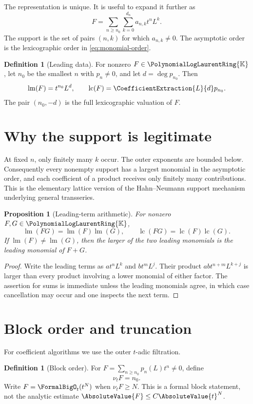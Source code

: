 \documentclass[11pt,oneside]{book}
\newtheorem{proposition}[theorem]{Proposition}
\theoremstyle{definition}
\newtheorem{definition}[theorem]{Definition}
\theoremstyle{remark}
\DeclareMathOperator{\lm}{lm}
\DeclareMathOperator{\lc}{lc}
\newcommand{\K}{\mathbb K}
\newcommand{\PLpoly}{\PolynomialLogLaurentRing{\K}}
\begin{document}
The representation is unique.  It is useful to expand it further as
\[
 F=\sum_{n\ge n_0}\sum_{k=0}^{d_n}a_{n,k}t^nL^k.
\]
The support is the set of pairs $(n,k)$ for which $a_{n,k}\ne0$.
The asymptotic order is the lexicographic order in \eqref{eq:monomial-order}.

\begin{definition}[Leading data]
For nonzero $F\in\PLpoly$, let $n_0$ be the smallest $n$ with
$p_n\ne0$, and let $d=\deg p_{n_0}$.  Then
\[
 \lm(F)=t^{n_0}L^d,
 \qquad
 \lc(F)=\CoefficientExtraction{L}{d}p_{n_0}.
\]
The pair $(n_0,-d)$ is the full lexicographic valuation of $F$.
\end{definition}

\section{Why the support is legitimate}
At fixed $n$, only finitely many $k$ occur.  The outer exponents are bounded
below.  Consequently every nonempty support has a largest monomial in the
asymptotic order, and each coefficient of a product receives only finitely
many contributions.  This is the elementary lattice version of the
Hahn--Neumann support mechanism underlying general transseries.

\begin{proposition}[Leading-term arithmetic]\label{prop:leading-arithmetic}
For nonzero $F,G\in\PLpoly$,
\[
 \lm(FG)=\lm(F)\lm(G),
 \qquad
 \lc(FG)=\lc(F)\lc(G).
\]
If $\lm(F)\ne\lm(G)$, then the larger of the two leading monomials is the
leading monomial of $F+G$.
\end{proposition}
\begin{proof}
Write the leading terms as $a t^nL^k$ and $b t^mL^j$.  Their product
$ab t^{n+m}L^{k+j}$ is larger than every product involving a lower monomial
of either factor.  The assertion for sums is immediate unless the leading
monomials agree, in which case cancellation may occur and one inspects the
next term.
\end{proof}

\section{Block order and truncation}
For coefficient algorithms we use the outer $t$-adic filtration.

\begin{definition}[Block order]
For $F=\sum_{n\ge n_0}p_n(L)t^n\ne0$, define
\[
 \nu_tF=n_0.
\]
Write $F=\FormalBigO_t(t^N)$ when $\nu_tF\ge N$.  This is a formal block statement,
not the analytic estimate
$\AbsoluteValue{F}\le C\AbsoluteValue{t}^N$.
\end{definition}
\end{document}
